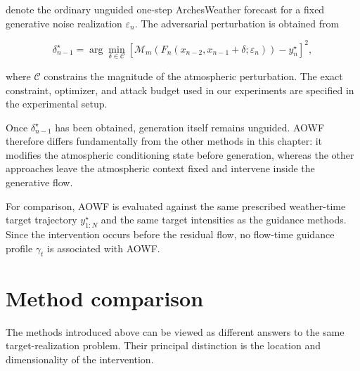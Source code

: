 denote the ordinary unguided one-step ArchesWeather forecast for a fixed
generative noise realization \(\varepsilon_n\). The adversarial perturbation
is obtained from

\begin{equation}
    \delta_{n-1}^\star
    =
    \arg\min_{\delta\in\mathcal{C}}
    \left[
        \mathcal{M}_m
        \left(
            F_n(
                x_{n-2},
                x_{n-1}+\delta;
                \varepsilon_n
            )
        \right)
        -
        y_n^\star
    \right]^2 ,
    \label{eq:aowf-target-objective}
\end{equation}

where \(\mathcal{C}\) constrains the magnitude of the atmospheric perturbation.
The exact constraint, optimizer, and attack budget used in our experiments are
specified in the experimental setup.

Once \(\delta_{n-1}^\star\) has been obtained, generation itself remains
unguided. AOWF therefore differs fundamentally from the other methods in this
chapter: it modifies the atmospheric conditioning state before generation,
whereas the other approaches leave the atmospheric context fixed and intervene
inside the generative flow.

For comparison, AOWF is evaluated against the same prescribed weather-time
target trajectory \(y^\star_{1:N}\) and the same target intensities as the
guidance methods. Since the intervention occurs before the residual flow, no
flow-time guidance profile \(\gamma_t\) is associated with AOWF.

\section{Method comparison}
\label{sec:guidance-method-comparison}

The methods introduced above can be viewed as different answers to the same
target-realization problem. Their principal distinction is the location and
dimensionality of the intervention.

